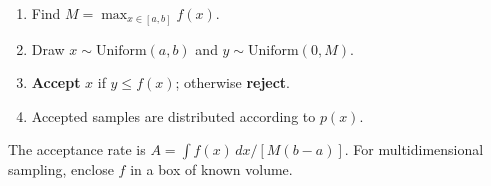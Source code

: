 \begin{enumerate}
  \item Find $M = \max_{x\in[a,b]} f(x)$.
  \item Draw $x \sim \text{Uniform}(a,b)$ and $y \sim \text{Uniform}(0,M)$.
  \item \textbf{Accept} $x$ if $y \le f(x)$; otherwise \textbf{reject}.
  \item Accepted samples are distributed according to $p(x)$.
\end{enumerate}

The acceptance rate is $A = \int f(x)\, dx / [M(b-a)]$.  For
multidimensional sampling, enclose $f$ in a box of known volume.

